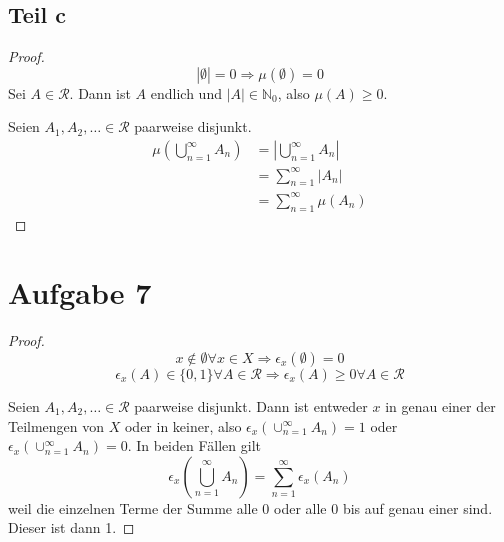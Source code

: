 \documentclass[10pt,a4paper]{article}
\begin{document}
\subsection{Teil c}
\begin{proof}
  \begin{equation}
    |\emptyset| = 0 \Rightarrow \mu(\emptyset) = 0
  \end{equation}
  Sei $A \in \mathscr{R}$.
  Dann ist $A$ endlich und $|A| \in \mathbb{N}_{0}$, also $\mu(A) \ge 0$.
  
  Seien $A_{1}, A_{2}, \dots \in \mathscr{R}$ paarweise disjunkt.
  \begin{align*}
    \mu(\bigcup_{n = 1}^{\infty} A_{n}) & = |\bigcup_{n = 1}^{\infty} A_{n}|\\
    & = \sum_{n = 1}^{\infty} |A_{n}|\\
    & = \sum_{n = 1}^{\infty} \mu(A_{n})
  \end{align*}
\end{proof}

\section{Aufgabe 7}
\begin{proof}
  \begin{equation}
    x \notin \emptyset \forall x \in X \Rightarrow \epsilon_{x}(\emptyset) = 0
  \end{equation}
  \begin{equation}
    \epsilon_{x}(A) \in \{ 0, 1 \} \forall A \in \mathscr{R} \Rightarrow \epsilon_{x}(A) \ge 0 \forall A \in \mathscr{R}
  \end{equation}
  
  Seien $A_{1}, A_{2}, \dots \in \mathscr{R}$ paarweise disjunkt.
  Dann ist entweder $x$ in genau einer der Teilmengen von $X$ oder in keiner, also $\epsilon_{x}(\cup_{n = 1}^{\infty} A_{n}) = 1$ oder $\epsilon_{x}(\cup_{n = 1}^{\infty} A_{n}) = 0$.
  In beiden Fällen gilt
  \begin{equation}
    \epsilon_{x}(\bigcup_{n = 1}^{\infty} A_{n}) = \sum_{n = 1}^{\infty} \epsilon_{x}(A_{n})
  \end{equation}
  weil die einzelnen Terme der Summe alle 0 oder alle 0 bis auf genau einer sind.
  Dieser ist dann 1.
\end{proof}
\end{document}
